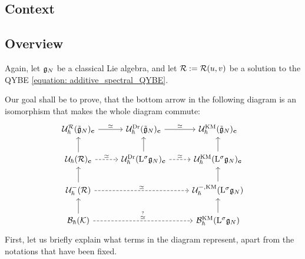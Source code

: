     \subsection{Context}
        

        
        
    \subsection{Overview}
        Again, let $\mathfrak{g}_N$ be a classical Lie algebra, and let $\mathcal{R} := \mathcal{R}(u, v)$ be a solution to the QYBE \eqref{equation: additive_spectral_QYBE}.
        
        Our goal shall be to prove, that the bottom arrow in the following diagram is an isomorphism that makes the whole diagram commute:
            \begin{equation} \label{diagram: twisted_q_yangians}
                \begin{tikzcd}
            	{\calU_{\hbar}^{\calR}(\tilde{\g}_N)_{\level}} & {\calU_{\hbar}^{\current}(\tilde{\g}_N)_{\level}} & {\calU_{\hbar}^{\KM}(\tilde{\g}_N)_{\level}} \\
            	{\calU_{\hbar}(\calR)_{\level}} & {\calU_{\hbar}^{\current}(\Loop^{\sigma}\g_N)_{\level}} & {\calU_{\hbar}^{\KM}(\Loop^{\sigma}\g_N)_{\level}} \\
            	{\calU^-_{\hbar}(\calR)} && {\calU_{\hbar}^{-, \KM}(\Loop^{\sigma}\g_N)} \\
            	{\calB_{\hbar}(\calK)} && {\calB_{\hbar}^{\KM}(\Loop^{\sigma} \g_N)}
            	\arrow["\cong", from=1-1, to=1-2]
            	\arrow["\cong", from=1-2, to=1-3]
            	\arrow[from=2-1, to=1-1]
            	\arrow["\cong", dashed, from=2-1, to=2-2]
            	\arrow[from=2-2, to=1-2]
            	\arrow["\cong", dashed, from=2-2, to=2-3]
            	\arrow[from=2-3, to=1-3]
            	\arrow[from=3-1, to=2-1]
            	\arrow["\cong", dashed, from=3-1, to=3-3]
            	\arrow[from=3-3, to=2-3]
            	\arrow[from=4-1, to=3-1]
            	\arrow["{\overset{?}{\cong}}", dashed, from=4-1, to=4-3]
            	\arrow[from=4-3, to=3-3]
                \end{tikzcd}
            \end{equation}
        First, let us briefly explain what terms in the diagram represent, apart from the notations that have been fixed.
        
